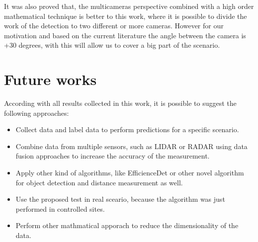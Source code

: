It was also proved that, the multicameras perspective combined with a high order mathematical technique is better to this work, where it is possible to divide the work of the detection to two different or more cameras. However for our motivation and based on the current literature the angle between the camera is +30 degrees, with this will allow us to cover a big part of the scenario.   

\section{Future works}

According with all results collected in this work, it is possible to suggest the following approaches:

\begin{itemize}
    \item Collect data and label data to perform predictions for a specific scenario.
    \item Combine data from multiple sensors, such as LIDAR or RADAR using data fusion approaches to increase the accuracy 
    of the measurement. 
    \item Apply other kind of algorithms, like EfficienceDet or other novel algorithm for object detection and distance measurement as well.
    \item Use the proposed test in real sceario, because the algorithm was just performed in controlled sites. 
    \item Perform other mathmatical apporach to reduce the dimensionality of the data.
\end{itemize}